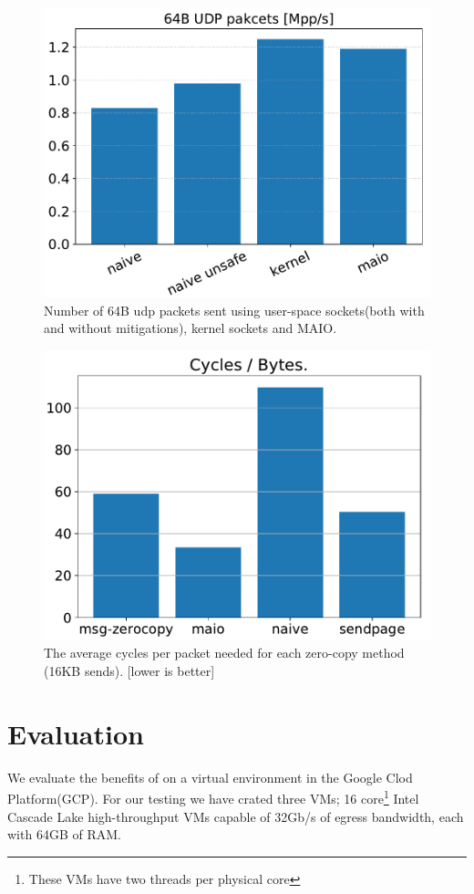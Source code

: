 \begin{figure}[t]
    \centering
    \includegraphics[width=\columnwidth]{syscall.pdf}
    \caption{Number of 64B udp packets sent using user-space sockets(both with and without mitigations), kernel sockets and MAIO.} 
    \label{fig:pps}
\end{figure}
\begin{figure}[t]
    \centering
    \includegraphics[width=\columnwidth]{send.pdf}
    \caption{The average cycles per packet needed for each zero-copy method (16KB sends). [lower is better]}
    \label{fig:tx_compare}
\end{figure}
\section{Evaluation}\label{sec:eval}
We evaluate the benefits of \oursys on a virtual environment in the Google Clod Platform(GCP).
For our testing we have crated three VMs; 16 core\footnote{These VMs have two threads per physical core} Intel Cascade Lake high-throughput VMs capable of 32Gb/s of egress bandwidth\cite{gcp}, each with 64GB of RAM.


